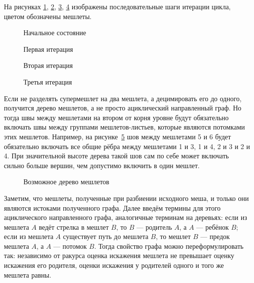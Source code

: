 На рисунках \ref{fig:metis-0}, \ref{fig:metis-1}, \ref{fig:metis-2}, \ref{fig:metis-3} изображены последовательные шаги итерации цикла, цветом обозначены мешлеты.
\begin{figure}[H]
    \centering
    
    \caption{Начальное состояние}
    \label{fig:metis-0}
\end{figure}
\begin{figure}[H]
    \centering
    
    \caption{Первая итерация}
    \label{fig:metis-1}
\end{figure}
\begin{figure}[H]
    \centering
    
    \caption{Вторая итерация}
    \label{fig:metis-2}
\end{figure}
\begin{figure}[H]
    \centering
    
    \caption{Третья итерация}
    \label{fig:metis-3}
\end{figure}

Если не разделять супермешлет на два мешлета, а децимировать его до одного, получится дерево мешлетов, а не просто ациклический направленный граф.
Но тогда швы между мешлетами на втором от корня уровне будут обязательно включать швы между группами мешлетов-листьев, которые являются потомками этих мешлетов.
Например, на рисунке~\ref{fig:meshlet-tree-example} шов между мешлетами 5 и 6 будет обязательно включать все общие рёбра между мешлетами 1 и 3, 1 и 4, 2 и 3 и 2 и 4.
При значительной высоте дерева такой шов сам по себе может включать сильно больше вершин, чем допустимо включить в один мешлет.
\begin{figure}[h]
    \centering
    \caption{Возможное дерево мешлетов}
    \label{fig:meshlet-tree-example}
\end{figure}

Заметим, что мешлеты, полученные при разбиении исходного меша, и только они являются истоками полученного графа.
Далее введём термины для этого ациклического направленного графа, аналогичные терминам на деревьях: если из мешлета $A$ ведёт стрелка в мешлет $B$, то $B$ --- родитель $A$, а $A$ --- ребёнок $B$; если из мешлета $A$ существует путь до мешлета $B$, то мешлет $B$ --- предок мешлета $A$, а $A$ --- потомок $B$.
Тогда свойство графа можно переформулировать так: независимо от ракурса оценка искажения мешлета не превышает оценку искажения его родителя, оценки искажения у родителей одного и того же мешлета равны.

